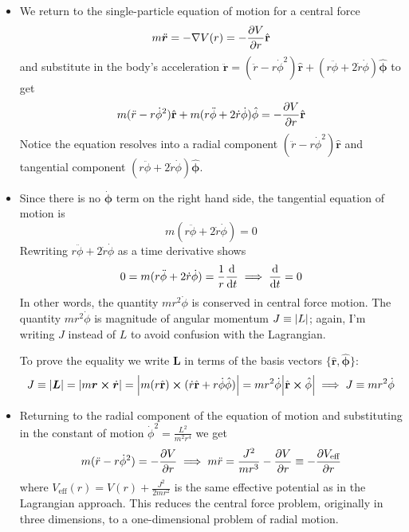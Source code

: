 \documentclass[11pt, a4paper]{article}
\newcommand{\uvec}[1]{\hat{\mathbf{#1}}}
\newcommand{\bdot}[1]{\dot{\bm{#1}}}
\newcommand{\bddot}[1]{\ddot{\bm{#1}}}
\newcommand{\veff}{V_{\text{eff}}}
\renewcommand{\grad}{\nabla }
\begin{document}
\begin{itemize}
	\item We return to the single-particle equation of motion for a central force
	\begin{equation*}
		 m \bddot{r} = - \grad{V}(r) = - \pdv{V}{r} \uvec{r}
	\end{equation*}
	and substitute in the body's acceleration $ \bddot{r} = (\ddot{r} - r\dot{\phi}^{2}) \uvec{r} + (r \ddot{\phi} + 2 \dot{r} \dot{\phi}) \uvec{\phi} $ to get
	\begin{equation*}
		m(\ddot{r} - r\dot{\phi}^{2}) \uvec{r} + m(r \ddot{\phi} + 2 \dot{r} \dot{\phi}) \uvec{\phi} = - \pdv{V}{r} \uvec{r}
	\end{equation*}
	Notice the equation resolves into a radial component $ (\ddot{r} - r\dot{\phi}^{2}) \uvec{r} $ and tangential  component $ (r \ddot{\phi} + 2 \dot{r} \dot{\phi}) \uvec{\phi} $. 
	
	\item Since there is no $ \bdot{\phi} $ term on the right hand side, the tangential equation of motion is
	\begin{equation*}
		 m(r \ddot{\phi} + 2 \dot{r} \dot{\phi}) = 0 
	\end{equation*}
	Rewriting $ r \ddot{\phi} + 2 \dot{r} \dot{\phi} $ as a time derivative shows
	\begin{equation*}
		0 = m(r \ddot{\phi} + 2 \dot{r} \dot{\phi}) = \frac{1}{r} \dv{}{t} (mr^{2} \dot{\phi}) \implies \dv{}{t} (m r^{2} \dot{\phi}) = 0
	\end{equation*}
	In other words, the quantity $ m r^{2} \dot{\phi} $ is conserved in central force motion. The quantity $ m r^{2} \dot{\phi} $ is magnitude of angular momentum $ J \equiv \abs{L} $; again, I'm writing $ J $ instead of $ L $ to avoid confusion with the Lagrangian.
	
	To prove the equality we write $ \bm{L} $ in terms of the basis vectors $ \{\uvec{r}, \uvec{\phi} \}$:
	\begin{equation*}
		J \equiv \abs{\bm{L}} = \abs{m \bm{r} \cross \bdot{r}} = \abs{m (r\uvec{r}) \cross (\dot{r} \uvec{r} + r \dot{\phi} \uvec{\phi})} =  mr^{2}\dot{\phi} \abs{\uvec{r}\cross \uvec{\phi}} \implies J \equiv m r^{2} \dot{\phi}
	\end{equation*}	
	
	\item Returning to the radial component of the equation of motion and substituting in the constant of motion $ \dot{\phi}^{2} = \frac{L^{2}}{m^{2}r^{4}} $ we get
	\begin{equation*}
		m(\ddot{r} - r \dot{\phi}^{2}) = - \pdv{V}{r} \implies m\ddot{r} = \frac{J^{2}}{mr^{3}} - \pdv{V}{r} \equiv - \pdv{\veff}{r}
	\end{equation*}
	where $ \veff(r) = V(r) + \frac{J^{2}}{2mr^{2}} $ is the same effective potential as in the Lagrangian approach. This reduces the central force problem, originally in three dimensions, to a one-dimensional problem of radial motion. 
	

\end{itemize}
\end{document}

